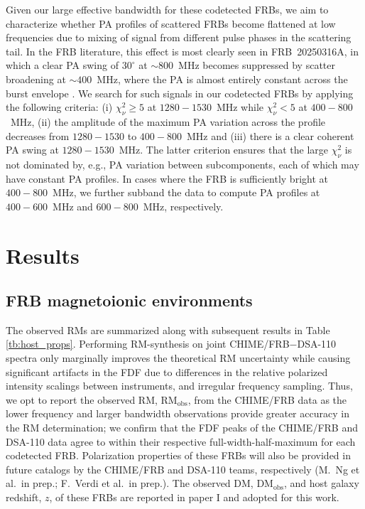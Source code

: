 \documentclass[twocolumn, linenumbers]{aastex701}
\begin{document}
Given our large effective bandwidth for these codetected FRBs, we aim to characterize whether PA profiles of scattered FRBs become flattened at low frequencies due to mixing of signal from different pulse phases in the scattering tail. In the FRB literature, this effect is most clearly seen in FRB~20250316A, in which a clear PA swing of $30^\circ$ at $\sim800$~MHz becomes suppressed by scatter broadening at $\sim 400$~MHz, where the PA is almost entirely constant across the burst envelope \citep[see Figure 5 by][]{2025ApJ...989L..48C}. We search for such signals in our codetected FRBs by applying the following criteria: (i) $\chi_\nu^2 \geq 5$ at $1280-1530$~MHz while $\chi_\nu^2 < 5$ at $400-800$~MHz, (ii) the amplitude of the maximum PA variation across the profile decreases from $1280-1530$ to $400-800$~MHz and (iii) there is a clear coherent PA swing at $1280-1530$~MHz. The latter criterion ensures that the large $\chi_\nu^2$ is not dominated by, e.g., PA variation between subcomponents, each of which may have constant PA profiles. In cases where the FRB is sufficiently bright at $400-800$~MHz, we further subband the data to compute PA profiles at $400-600$~MHz and $600-800$~MHz, respectively.

\section{Results} \label{sec:results}
\subsection{FRB magnetoionic environments} \label{sec:results_host_env}
The observed RMs are summarized along with subsequent results in Table \ref{tb:host_props}. Performing RM-synthesis on joint CHIME/FRB$-$DSA-110 spectra only marginally improves the theoretical RM uncertainty while causing significant artifacts in the FDF due to differences in the relative polarized intensity scalings between instruments, and irregular frequency sampling. Thus, we opt to report the observed RM, $\mathrm{RM}_\mathrm{obs}$, from the CHIME/FRB data as the lower frequency and larger bandwidth observations provide greater accuracy in the RM determination; we confirm that the FDF peaks of the CHIME/FRB and DSA-110 data agree to within their respective full-width-half-maximum for each codetected FRB. Polarization properties of these FRBs will also be provided in future catalogs by the CHIME/FRB and DSA-110 teams, respectively (M.~Ng et al.~in prep.; F.~Verdi et al.~in prep.). The observed DM, $\mathrm{DM}_\mathrm{obs}$, and host galaxy redshift, $z$, of these FRBs are reported in paper I and adopted for this work. 
\end{document}
